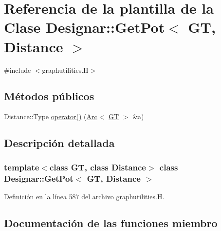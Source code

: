 \hypertarget{class_designar_1_1_get_pot}{}\section{Referencia de la plantilla de la Clase Designar\+:\+:Get\+Pot$<$ GT, Distance $>$}
\label{class_designar_1_1_get_pot}


{\ttfamily \#include $<$graphutilities.\+H$>$}

\subsection*{Métodos públicos}
\begin{DoxyCompactItemize}
\item 
Distance\+::\+Type \hyperlink{class_designar_1_1_get_pot_a7f7a08b54b37d011ad4eb6a12cba94ec}{operator()} (\hyperlink{namespace_designar_a3f55fb5513d62ff47cbc8f72b8e95d6f}{Arc}$<$ \hyperlink{demo-buildgraph_8_c_a3001c40d2c31ca87ed96cd7d1334a55e}{GT} $>$ \&a)
\end{DoxyCompactItemize}


\subsection{Descripción detallada}
\subsubsection*{template$<$class GT, class Distance$>$\newline
class Designar\+::\+Get\+Pot$<$ G\+T, Distance $>$}



Definición en la línea 587 del archivo graphutilities.\+H.



\subsection{Documentación de las funciones miembro}
\mbox{\label{class_designar_1_1_get_pot_a7f7a08b54b37d011ad4eb6a12cba94ec}} 
